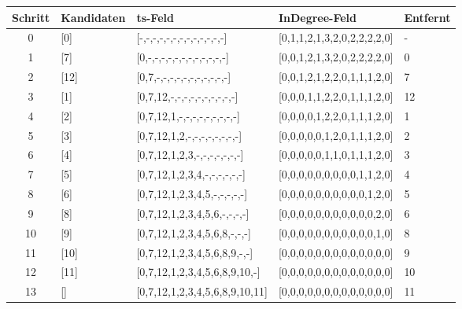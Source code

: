 \documentclass[a4paper,12pt]{article}
\begin{document}
{\small
\begin{tabular}{|c|l|l|l|l|}
\hline
\textbf{Schritt} & \textbf{Kandidaten} & \textbf{ts-Feld} & \textbf{InDegree-Feld} & \textbf{Entfernt} \\
\hline
0 & [0] & [-,-,-,-,-,-,-,-,-,-,-,-,-] & [0,1,1,2,1,3,2,0,2,2,2,2,0] & - \\
\hline
1 & [7] & [0,-,-,-,-,-,-,-,-,-,-,-,-] & [0,0,1,2,1,3,2,0,2,2,2,2,0] & 0 \\
\hline
2 & [12] & [0,7,-,-,-,-,-,-,-,-,-,-,-] & [0,0,1,2,1,2,2,0,1,1,1,2,0] & 7 \\
\hline
3 & [1] & [0,7,12,-,-,-,-,-,-,-,-,-,-] & [0,0,0,1,1,2,2,0,1,1,1,2,0] & 12 \\
\hline
4 & [2] & [0,7,12,1,-,-,-,-,-,-,-,-,-] & [0,0,0,0,1,2,2,0,1,1,1,2,0] & 1 \\
\hline
5 & [3] & [0,7,12,1,2,-,-,-,-,-,-,-,-] & [0,0,0,0,0,1,2,0,1,1,1,2,0] & 2 \\
\hline
6 & [4] & [0,7,12,1,2,3,-,-,-,-,-,-,-] & [0,0,0,0,0,1,1,0,1,1,1,2,0] & 3 \\
\hline
7 & [5] & [0,7,12,1,2,3,4,-,-,-,-,-,-] & [0,0,0,0,0,0,0,0,0,1,1,2,0] & 4 \\
\hline
8 & [6] & [0,7,12,1,2,3,4,5,-,-,-,-,-] & [0,0,0,0,0,0,0,0,0,0,1,2,0] & 5 \\
\hline
9 & [8] & [0,7,12,1,2,3,4,5,6,-,-,-,-] & [0,0,0,0,0,0,0,0,0,0,0,2,0] & 6 \\
\hline
10 & [9] & [0,7,12,1,2,3,4,5,6,8,-,-,-] & [0,0,0,0,0,0,0,0,0,0,0,1,0] & 8 \\
\hline
11 & [10] & [0,7,12,1,2,3,4,5,6,8,9,-,-] & [0,0,0,0,0,0,0,0,0,0,0,0,0] & 9 \\
\hline
12 & [11] & [0,7,12,1,2,3,4,5,6,8,9,10,-] & [0,0,0,0,0,0,0,0,0,0,0,0,0] & 10 \\
\hline
13 & [] & [0,7,12,1,2,3,4,5,6,8,9,10,11] & [0,0,0,0,0,0,0,0,0,0,0,0,0] & 11 \\
\hline
\end{tabular}
}
\vspace{1cm}
\end{document}
